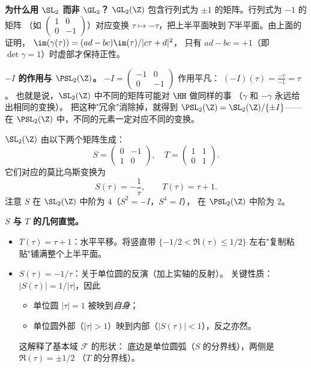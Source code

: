 \textbf{为什么用 $\SL_2$ 而非 $\GL_2$？}
$\GL_2(\Z)$ 包含行列式为 $\pm 1$ 的矩阵。行列式为 $-1$ 的矩阵
（如 $\begin{pmatrix} 1 & 0 \\ 0 & -1 \end{pmatrix}$）对应变换
$\tau \mapsto -\tau$，把上半平面映到\emph{下}半平面。由上面的证明，
$\im(\gamma(\tau)) = (ad - bc)\im(\tau)/|c\tau + d|^2$，
只有 $ad - bc = +1$（即 $\det \gamma = 1$）时虚部才保持正性。

\textbf{$-I$ 的作用与 $\PSL_2(\Z)$。}
$-I = \begin{pmatrix} -1 & 0 \\ 0 & -1 \end{pmatrix}$ 作用平凡：
$(-I)(\tau) = \frac{-\tau}{-1} = \tau$。
也就是说，$\SL_2(\Z)$ 中不同的矩阵可能对 $\HH$ 做同样的事
（$\gamma$ 和 $-\gamma$ 永远给出相同的变换）。
把这种"冗余"消除掉，就得到
$\PSL_2(\Z) = \SL_2(\Z)/\{\pm I\}$——
在 $\PSL_2(\Z)$ 中，不同的元素一定对应不同的变换。

\begin{theorem}[$\SL_2(\Z)$ 的生成元]
\label{thm:sl2z-generators}
$\SL_2(\Z)$ 由以下两个矩阵生成：
\[
  S = \begin{pmatrix} 0 & -1 \\ 1 & 0 \end{pmatrix}, \quad
  T = \begin{pmatrix} 1 & 1 \\ 0 & 1 \end{pmatrix}.
\]
它们对应的莫比乌斯变换为
\[
  S(\tau) = -\frac{1}{\tau}, \qquad T(\tau) = \tau + 1.
\]
注意 $S$ 在 $\SL_2(\Z)$ 中阶为 $4$（$S^2 = -I$，$S^4 = I$），
在 $\PSL_2(\Z)$ 中阶为 $2$。
\end{theorem}

\textbf{$S$ 与 $T$ 的几何直觉。}
\label{rem:S-T-geometry}
\begin{itemize}
  \item $T(\tau) = \tau + 1$：水平平移。将竖直带
    $\{-1/2 < \Re(\tau) \leq 1/2\}$ 左右"复制粘贴"铺满整个上半平面。
  \item $S(\tau) = -1/\tau$：关于单位圆的反演（加上实轴的反射）。
    关键性质：$|S(\tau)| = 1/|\tau|$，因此
    \begin{itemize}
      \item 单位圆 $|\tau| = 1$ 被映到\emph{自身}；
      \item 单位圆外部（$|\tau| > 1$）映到内部（$|S(\tau)| < 1$），反之亦然。
    \end{itemize}
    这解释了基本域 $\mathcal{F}$ 的形状：
    底边是单位圆弧（$S$ 的分界线），两侧是 $\Re(\tau) = \pm 1/2$
    （$T$ 的分界线）。
\end{itemize}


